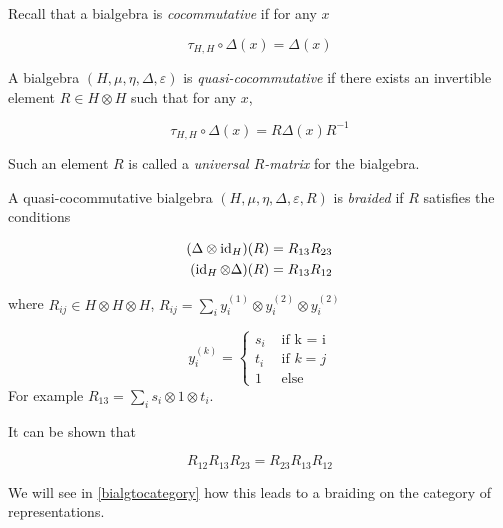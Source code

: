 Recall that a bialgebra is \emph{cocommutative} if for any $x$

\begin{equation}
    \tau_{H,H}\circ \Delta(x)  = \Delta(x)
\end{equation}

\begin{defn}
    A bialgebra $(H,\mu,\eta, \Delta, \varepsilon)$ is
    \emph{quasi-cocommutative} if there exists an invertible element $R \in H
    \otimes H$ such that for any $x$,

    \begin{equation}
        \tau_{H,H}\circ \Delta(x)  = R \Delta(x) R^{-1}
    \end{equation}
\end{defn}

Such an element $R$ is called a \emph{universal $R$-matrix} for the bialgebra. 

\begin{defn}
    A quasi-cocommutative bialgebra $(H,\mu,\eta, \Delta, \varepsilon, R)$ is
    \emph{braided} if $R$ satisfies the conditions

    \begin{align}
        (\Delta \otimes \operatorname{id}_H)(R) = R_{13} R_{23} \\
        (\operatorname{id}_H \otimes \Delta)(R) = R_{13} R_{12} 
    \end{align}

    where $R_{ij} \in H \otimes H \otimes H$, $R_{ij} = \sum_{i} y_i^{(1)} \otimes y_{i}^{(2)} \otimes y_i^{(2)}$

    \begin{equation}
        y_i^{(k)} = \begin{cases} s_i & \text{ if k = i} \\
                                  t_i & \text{ if $k = j$} \\
                                  1   & \text{ else}
                    \end{cases}
    \end{equation}
    For example $R_{13} = \sum_{i} s_i \otimes 1 \otimes t_i$.

\end{defn}

It can be shown that 

\begin{equation}
    R_{12} R_{13} R_{23} = R_{23} R_{13} R_{12}
\end{equation}

We will see in \ref{bialgtocategory} how this leads to a braiding on the
category of representations.
